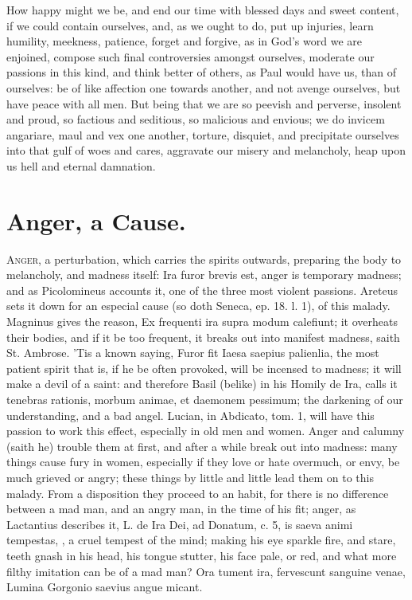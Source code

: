 {How happy might we be, and end our time with blessed days and sweet
content, if we could contain ourselves, and, as we ought to do, put up
injuries, learn humility, meekness, patience, forget and forgive, as in
God's word we are enjoined, compose such final controversies
amongst ourselves, moderate our passions in this kind, and think better
of others, as Paul would have us, than of ourselves: be of like
affection one towards another, and not avenge ourselves, but have peace
with all men. But being that we are so peevish and perverse, insolent
and proud, so factious and seditious, so malicious and envious; we do
invicem angariare, maul and vex one another, torture, disquiet, and
precipitate ourselves into that gulf of woes and cares, aggravate our
misery and melancholy, heap upon us hell and eternal damnation.

\section{Anger, a Cause.}

\lettrine{A}{nger}, a perturbation, which carries the spirits outwards, preparing
the body to melancholy, and madness itself: Ira furor brevis est, anger
is temporary madness; and as Picolomineus accounts it, one of the
three most violent passions. Areteus sets it down for an especial
cause (so doth Seneca, ep. 18. l. 1), of this malady. Magninus
gives the reason, Ex frequenti ira supra modum calefiunt; it overheats
their bodies, and if it be too frequent, it breaks out into manifest
madness, saith St. Ambrose. 'Tis a known saying, Furor fit Iaesa
saepius palienlia, the most patient spirit that is, if he be often
provoked, will be incensed to madness; it will make a devil of a saint:
and therefore Basil (belike) in his Homily de Ira, calls it tenebras
rationis, morbum animae, et daemonem pessimum; the darkening of our
understanding, and a bad angel. Lucian, in Abdicato, tom. 1, will
have this passion to work this effect, especially in old men and women.
Anger and calumny (saith he) trouble them at first, and after a while
break out into madness: many things cause fury in women, especially if
they love or hate overmuch, or envy, be much grieved or angry; these
things by little and little lead them on to this malady. From a
disposition they proceed to an habit, for there is no difference
between a mad man, and an angry man, in the time of his fit; anger, as
Lactantius describes it, L. de Ira Dei, ad Donatum, c. 5, is
saeva animi tempestas, \etc{}, a cruel tempest of the mind; making
his eye sparkle fire, and stare, teeth gnash in his head, his tongue
stutter, his face pale, or red, and what more filthy imitation can be
of a mad man?
Ora tument ira, fervescunt sanguine venae,
Lumina Gorgonio saevius angue micant.

}

